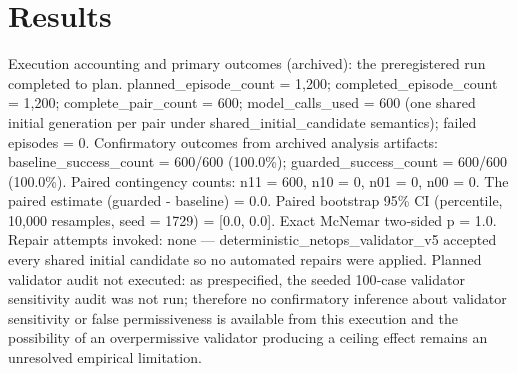 \documentclass[conference]{IEEEtran}
\begin{document}
\section{Results}
Execution accounting and primary outcomes (archived): the preregistered run completed to plan. planned\_episode\_count = 1,200; completed\_episode\_count = 1,200; complete\_pair\_count = 600; model\_calls\_used = 600 (one shared initial generation per pair under shared\_initial\_candidate semantics); failed episodes = 0. Confirmatory outcomes from archived analysis artifacts: baseline\_success\_count = 600/600 (100.0\%); guarded\_success\_count = 600/600 (100.0\%). Paired contingency counts: n11 = 600, n10 = 0, n01 = 0, n00 = 0. The paired estimate (guarded - baseline) = 0.0. Paired bootstrap 95\% CI (percentile, 10,000 resamples, seed = 1729) = [0.0, 0.0]. Exact McNemar two‑sided p = 1.0. Repair attempts invoked: none --- deterministic\_netops\_validator\_v5 accepted every shared initial candidate so no automated repairs were applied. Planned validator audit not executed: as prespecified, the seeded 100‑case validator sensitivity audit was not run; therefore no confirmatory inference about validator sensitivity or false permissiveness is available from this execution and the possibility of an overpermissive validator producing a ceiling effect remains an unresolved empirical limitation.
\end{document}
